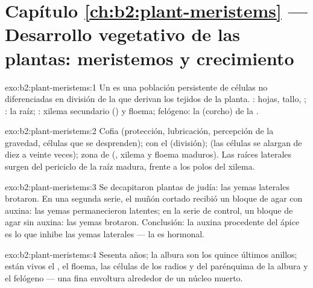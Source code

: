\section*{Capítulo \ref{ch:b2:plant-meristems} --- Desarrollo vegetativo de las plantas: meristemos y crecimiento}

\begin{solution}{exo:b2:plant-meristems:1}
Un  es una población persistente de células no diferenciadas en
división de la que derivan los tejidos de la planta. : hojas, tallo, ; : la raíz;
: xilema secundario () y floema; felógeno: la
 (corcho) de la .
\end{solution}

\begin{solution}{exo:b2:plant-meristems:2}
Cofia (protección, lubricación, percepción de la gravedad, células que se
desprenden);  con el  (división);  (las células se alargan de diez a veinte veces); zona de
 (, xilema y floema maduros). Las raíces
laterales surgen del periciclo de la raíz madura, frente a los polos del
xilema.
\end{solution}

\begin{solution}{exo:b2:plant-meristems:3}
Se decapitaron plantas de judía: las yemas laterales brotaron. En una
segunda serie, el muñón cortado recibió un bloque de agar con auxina: las
yemas permanecieron latentes; en la serie de control, un bloque de agar
sin auxina: las yemas brotaron. Conclusión: la auxina procedente del ápice
es lo que inhibe las yemas laterales --- la  es hormonal.
\end{solution}

\begin{solution}{exo:b2:plant-meristems:4}
Sesenta años; la albura son los quince últimos anillos; están vivos el
, el floema, las células de los radios y del parénquima de la
albura y el felógeno --- una fina envoltura alrededor de un núcleo muerto.
\end{solution}

